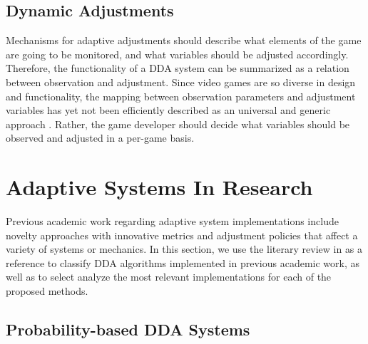\subsection{Dynamic Adjustments}

Mechanisms for adaptive adjustments should describe what elements of the game are going to be monitored, and what variables should be adjusted accordingly. Therefore, the functionality of a DDA system can be summarized as a relation between observation and adjustment. Since video games are so diverse in design and functionality, the mapping between observation parameters and adjustment variables has yet not been efficiently described as an universal and generic approach \cite{PHD_DynamicDifficultyAdjustment}. Rather, the game developer should decide what variables should be observed and adjusted in a per-game basis.

\section{Adaptive Systems In Research}

Previous academic work regarding adaptive system implementations include novelty approaches with innovative metrics and adjustment policies that affect a variety of systems or mechanics. In this section, we use the literary review in \cite{article_ddareview} as a reference to classify DDA algorithms implemented in previous academic work, as well as to select analyze the most relevant implementations for each of the proposed methods.

\subsection{Probability-based DDA Systems}
\label{sec:statistical-adjustments}




